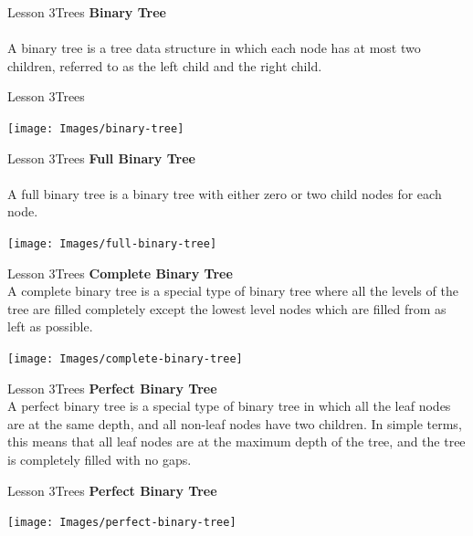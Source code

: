 \documentclass[aspectratio=1610]{beamer}
\begin{document}
\begin{frame}{Lesson 3}{Trees}
\LARGE
\textbf{Binary Tree}\\~\\
A binary tree is a tree data structure in which each node has at
most two children, referred to as the left child and the right
child.
\end{frame}


\begin{frame}{Lesson 3}{Trees}
\begin{center}
\texttt{[image: Images/binary-tree]}
\end{center}
\end{frame}

\begin{frame}{Lesson 3}{Trees}
\LARGE
\textbf{Full Binary Tree}\\~\\
A full binary tree is a binary tree with either zero or two child
nodes for each node. 
\begin{center}
\texttt{[image: Images/full-binary-tree]}
\end{center}
\end{frame}


\begin{frame}{Lesson 3}{Trees}
\LARGE
\textbf{Complete Binary Tree}\\
A complete binary tree is a special type of binary tree where all
the levels of the tree are filled completely except the lowest level
nodes which are filled from as left as possible.
\begin{center}
\texttt{[image: Images/complete-binary-tree]}
\end{center}
\end{frame}


\begin{frame}{Lesson 3}{Trees}
\LARGE
\textbf{Perfect Binary Tree}\\
A perfect binary tree is a special type of binary tree in which all
the leaf nodes are at the same depth, and all non-leaf nodes have
two children. In simple terms, this means that all leaf nodes are at
the maximum depth of the tree, and the tree is completely filled
with no gaps.
\end{frame}


\begin{frame}{Lesson 3}{Trees}
\LARGE
\textbf{Perfect Binary Tree}\\
\begin{center}
\texttt{[image: Images/perfect-binary-tree]}
\end{center}
\end{frame}
\end{document}
